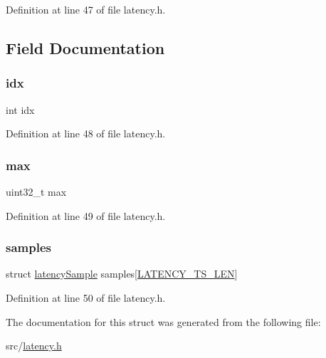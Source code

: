 Definition at line 47 of file latency.\+h.



\subsection{Field Documentation}
\mbox{\label{structlatency_time_series_ae40354a1051342eb5a9db005715dcfa9}} 
\subsubsection{\texorpdfstring{idx}{idx}}
{\footnotesize\ttfamily int idx}



Definition at line 48 of file latency.\+h.

\mbox{\label{structlatency_time_series_a43e74ba18dc1a237d9f7737ce8df350e}} 
\subsubsection{\texorpdfstring{max}{max}}
{\footnotesize\ttfamily uint32\+\_\+t max}



Definition at line 49 of file latency.\+h.

\mbox{\label{structlatency_time_series_a153186b2a352798a182b7269613f2466}} 
\subsubsection{\texorpdfstring{samples}{samples}}
{\footnotesize\ttfamily struct \hyperlink{structlatency_sample}{latency\+Sample} samples\mbox{[}\hyperlink{latency_8h_a7e3ba352d9d7bb4c88c2c42c16e6674b}{L\+A\+T\+E\+N\+C\+Y\+\_\+\+T\+S\+\_\+\+L\+EN}\mbox{]}}



Definition at line 50 of file latency.\+h.



The documentation for this struct was generated from the following file\+:\begin{DoxyCompactItemize}
\item 
src/\hyperlink{latency_8h}{latency.\+h}\end{DoxyCompactItemize}
